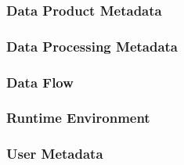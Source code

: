 \subsubsection{Data Product Metadata}

\subsubsection{Data Processing Metadata}

\subsubsection{Data Flow}

\subsubsection{Runtime Environment}

\subsubsection{User Metadata}
